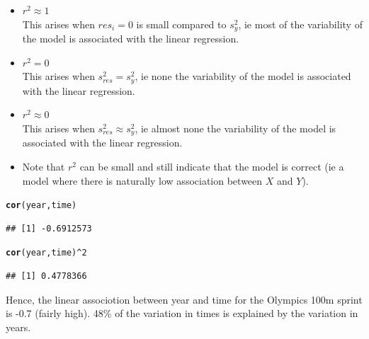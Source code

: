 \documentclass[t,xcolor=pdftex,dvipsnames,table]{beamer}\usepackage[]{graphicx}\usepackage[]{color}
\makeatletter
\newcommand{\hlnum}[1]{\textcolor[rgb]{0.686,0.059,0.569}{#1}}%
\newcommand{\hlopt}[1]{\textcolor[rgb]{0,0,0}{#1}}%
\newcommand{\hlstd}[1]{\textcolor[rgb]{0.345,0.345,0.345}{#1}}%
\newcommand{\hlkwd}[1]{\textcolor[rgb]{0.737,0.353,0.396}{\textbf{#1}}}%
\newenvironment{kframe}{%
 \def\at@end@of@kframe{}%
 \ifinner\ifhmode%
  \def\at@end@of@kframe{\end{minipage}}%
  \begin{minipage}{\columnwidth}%
 \fi\fi%
 \def\FrameCommand##1{\hskip\@totalleftmargin \hskip-\fboxsep
 \colorbox{shadecolor}{##1}\hskip-\fboxsep
     \hskip-\linewidth \hskip-\@totalleftmargin \hskip\columnwidth}%
 \MakeFramed {\advance\hsize-\width
   \@totalleftmargin\z@ \linewidth\hsize
   \@setminipage}}%
 {\par\unskip\endMakeFramed%
 \at@end@of@kframe}
\newenvironment{knitrout}{}{} %
\makeatother
\begin{document}
\begin{frame}[fragile]{}

\begin{itemize}
\item  $r^2 \approx 1$ \\
This arises when $res_i=0$ is small compared to $s_{y}^2$, ie most of the variability of the model is associated with the linear regression.

\item $r^2=0$ \\
This arises when $s_{res}^2=s_{y}^2$, ie none the variability of the model is associated with the linear regression. 

\item $r^2 \approx 0$ \\
This arises when $s_{res}^2 \approx s_{y}^2$, ie almost none the variability of the model is associated with the linear regression. 

\item Note that $r^2$ can be small and still indicate that the model is correct (ie a model where there is naturally low association between $X$ and $Y$).

\end{itemize}
\end{frame} 

\begin{frame}[fragile]{}  
\begin{knitrout}
\color{fgcolor}\begin{kframe}
\begin{alltt}
\hlkwd{cor}\hlstd{(year,time)}
\end{alltt}
\begin{verbatim}
## [1] -0.6912573
\end{verbatim}
\begin{alltt}
\hlkwd{cor}\hlstd{(year,time)}\hlopt{^}\hlnum{2}
\end{alltt}
\begin{verbatim}
## [1] 0.4778366
\end{verbatim}
\end{kframe}
\end{knitrout}

Hence, the linear associotion between year and time for the Olympics 100m sprint is  -0.7 (fairly high). 48\% of the variation in times is explained by the variation in years.



\end{frame}
\end{document}
